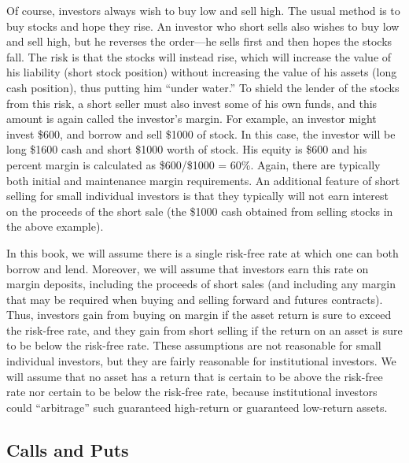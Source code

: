 Of course, investors always wish to buy low and sell high.  The usual method is to buy stocks and hope they rise.  An investor who short sells also wishes to buy low and sell high, but he reverses the order---he sells first and then hopes the stocks fall.  The risk is that the stocks will instead rise, which will increase the value of his liability (short stock position) without increasing the value of his assets (long cash position), thus putting him ``under water.''  To shield the lender of the stocks from this risk, a short seller must also invest some of his own funds, and this amount is again called the investor's margin.  For example, an investor might invest \$600, and borrow and sell \$1000 of stock.  In this case, the investor will be long \$1600 cash and short \$1000 worth of stock.  His equity is \$600 and his percent margin is calculated as \$600/\$1000 = 60\%.  Again, there are typically both initial and maintenance margin requirements.  An additional feature of short selling for small individual investors is that they typically will not earn interest on the proceeds of the short sale (the \$1000 cash obtained from selling stocks in the above example).  

In this book, we will assume there is a single risk-free rate at which one can both borrow and lend.  Moreover, we will assume that investors earn this rate on margin deposits, including the proceeds of short sales (and including any margin that may be required when buying and selling forward and futures contracts).  Thus, investors gain from buying on margin if the asset return is sure to exceed the risk-free rate, and they gain from short selling if the return on an asset is sure to be below the risk-free rate.   These assumptions are not reasonable for small individual investors, but they are fairly reasonable for institutional investors.  We will assume that no asset has a return that is certain to be above the risk-free rate nor certain to be below the risk-free rate, because institutional investors could ``arbitrage''  such guaranteed high-return or guaranteed low-return assets.

\subsection*{Calls and Puts}

